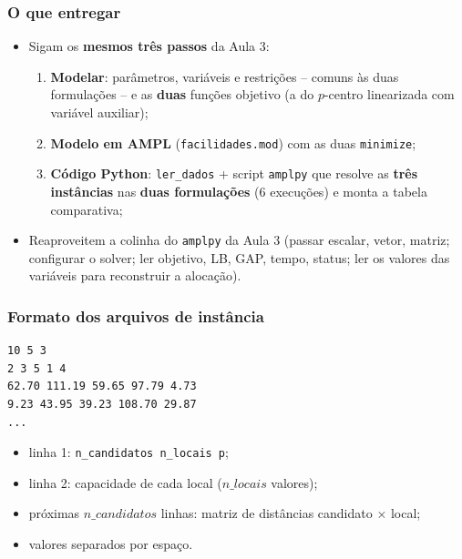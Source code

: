 \documentclass[fleqn]{beamer}
\begin{document}
\begin{frame}
	\frametitle{O que entregar}
	\begin{itemize}
		\item Sigam os \textbf{mesmos três passos} da Aula 3:
		\begin{enumerate}
			\item \textbf{Modelar}: parâmetros, variáveis e restrições --
				comuns às duas formulações -- e as \textbf{duas} funções
				objetivo (a do $p$-centro linearizada com variável
				auxiliar);
			\item \textbf{Modelo em AMPL} (\texttt{facilidades.mod}) com
				as duas \texttt{minimize};
			\item \textbf{Código Python}: \texttt{ler\_dados} + script
				\texttt{amplpy} que resolve as \textbf{três instâncias}
				nas \textbf{duas formulações} (6 execuções) e monta a
				tabela comparativa;
		\end{enumerate}
		\item Reaproveitem a colinha do \texttt{amplpy} da Aula 3 (passar
			escalar, vetor, matriz; configurar o solver; ler objetivo,
			LB, GAP, tempo, status; ler os valores das variáveis para
			reconstruir a alocação).
	\end{itemize}
\end{frame}

\begin{frame}[fragile]
	\frametitle{Formato dos arquivos de instância}
	\begin{lstlisting}
10 5 3
2 3 5 1 4
62.70 111.19 59.65 97.79 4.73
9.23 43.95 39.23 108.70 29.87
...
	\end{lstlisting}
	\begin{itemize}
		\item linha 1: \texttt{n\_candidatos  n\_locais  p};
		\item linha 2: capacidade de cada local ($n\_locais$ valores);
		\item próximas $n\_candidatos$ linhas: matriz de distâncias
			candidato $\times$ local;
		\item valores separados por espaço.
	\end{itemize}
\end{frame}
\end{document}
